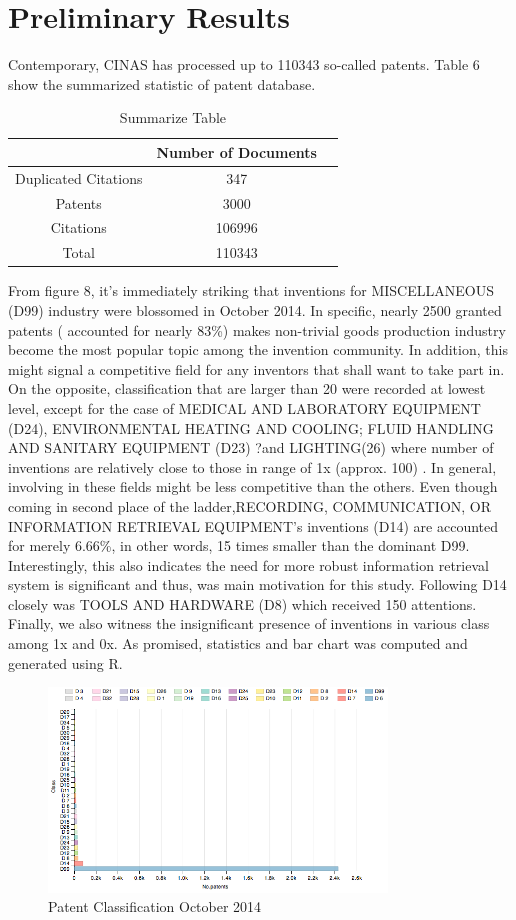 \documentclass{sig-alternate}
\begin{document}
{\section{Preliminary Results}
Contemporary, CINAS has processed up to 110343 so-called patents. Table 6 show the summarized statistic of patent database.
\begin{table}[htd]
\begin{tabular}{|c|c|l|} \hline
 &Number of Documents\\ \hline
 Duplicated Citations&347 \\ \hline
Patents&3000 \\ \hline
Citations&106996 \\ \hline
Total & 110343\\ \hline
\end{tabular}
\caption{Summarize Table}
\end{table}
From figure 8, it's immediately striking that inventions for MISCELLANEOUS (D99) industry were blossomed in October 2014. In specific, nearly 2500 granted patents ( accounted for nearly 83\%) makes non-trivial goods production industry become the most popular topic among the invention community. In addition, this might signal a competitive field for any inventors that shall want to take part in. On the opposite, classification that are larger than 20 were recorded at lowest level, except for the case of  MEDICAL AND LABORATORY EQUIPMENT (D24), ENVIRONMENTAL HEATING AND COOLING; FLUID HANDLING AND SANITARY EQUIPMENT (D23)
?and LIGHTING(26) where number of inventions are relatively close to those in range of 1x (approx. 100) . In general, involving in these fields might be less competitive than the others. Even though coming in second place of the ladder,RECORDING, COMMUNICATION, OR INFORMATION RETRIEVAL EQUIPMENT's inventions (D14) are accounted for merely 6.66\%, in other words, 15 times smaller than the dominant D99. Interestingly, this also indicates the need for more robust information retrieval system is significant and thus, was main motivation for this study. Following D14 closely was TOOLS AND HARDWARE (D8) which received 150 attentions. Finally, we  also witness the insignificant presence of inventions in various class among 1x and 0x. As promised, statistics and bar chart was computed and generated using R. 
\begin{figure}[htb]
\centering
\includegraphics[width=90mm]{rplot-classification.png}
\caption{ Patent Classification October 2014 }
\end{figure}

}
\end{document}
